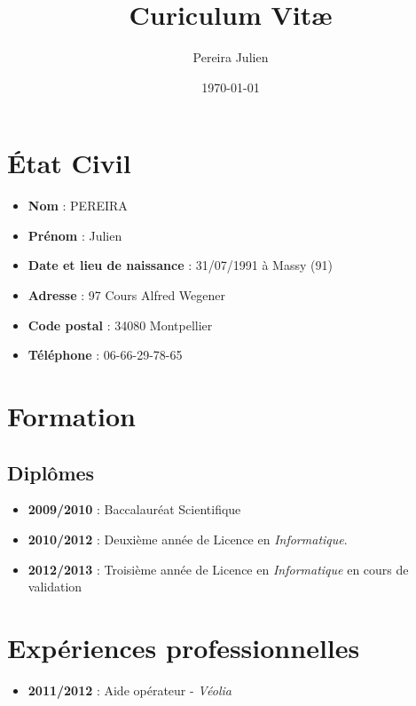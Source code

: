 \documentclass[a4paper]{article}
\title{Curiculum Vit\ae}
\author{Pereira Julien}
\date{\today}
\begin{document}
\maketitle

\section{\'Etat Civil}
\begin{itemize}
\item \textbf{Nom} : PEREIRA
\item \textbf{Prénom} : Julien
\item \textbf{Date et lieu de naissance} : 31/07/1991 à Massy (91)
\item \textbf{Adresse} : 97 Cours Alfred Wegener
\item \textbf{Code postal} : 34080 Montpellier
\item \textbf{Téléphone} : 06-66-29-78-65
\end{itemize}

\section{Formation}

\subsection{Diplômes}
\begin{itemize}
\item \textbf{2009/2010} : Baccalauréat Scientifique
\item \textbf{2010/2012} : Deuxième année de Licence en \emph{Informatique}.
\item \textbf{2012/2013} : Troisième année de Licence en \emph{Informatique} en cours de validation
\end{itemize}



\section{Expériences professionnelles}
\begin{itemize}
\item \textbf{2011/2012} : Aide opérateur - \emph{Véolia}
\end{itemize}
\end{document}
